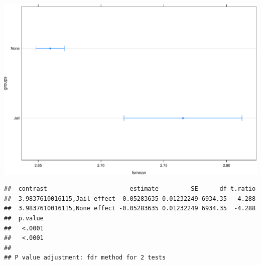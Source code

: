 \begin{frame}[fragile]

\begin{Shaded}
\begin{Highlighting}[]
\end{Highlighting}
\end{Shaded}

\includegraphics{Conditional_Models_files/figure-beamer/unnamed-chunk-35-1.pdf}

\end{frame}

\begin{frame}[fragile]

\begin{Shaded}
\begin{Highlighting}[]
 \NormalTok{)}
\end{Highlighting}
\end{Shaded}

\begin{verbatim}
##  contrast                       estimate         SE      df t.ratio
##  3.9837610016115,Jail effect  0.05283635 0.01232249 6934.35   4.288
##  3.9837610016115,None effect -0.05283635 0.01232249 6934.35  -4.288
##  p.value
##   <.0001
##   <.0001
## 
## P value adjustment: fdr method for 2 tests
\end{verbatim}

\end{frame}

